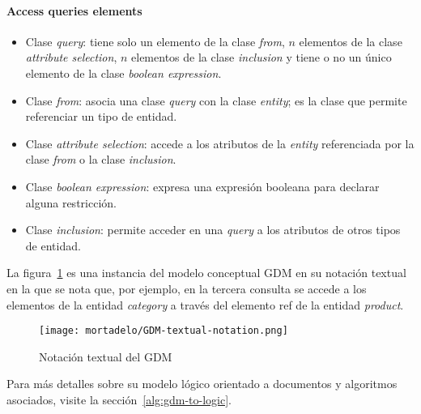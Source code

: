 \paragraph*{Access queries elements}


\begin{itemize}
    
    \item Clase \textit{query}: tiene solo un elemento de la clase \textit{from}, $n$ elementos de la clase \textit{attribute selection}, $n$ elementos de la clase \textit{inclusion} y tiene o no un único elemento de la clase \textit{boolean expression}.
    \item Clase \textit{from}: asocia una clase \textit{query} con la clase \textit{entity}; es la clase que permite referenciar un tipo de entidad.
    \item Clase \textit{attribute selection}: accede a los atributos de la \textit{entity} referenciada por la clase \textit{from} o la clase \textit{inclusion}.
    \item Clase \textit{boolean expression}: expresa una expresión booleana para declarar alguna restricción.
    \item Clase \textit{inclusion}: permite acceder en una \textit{query} a los atributos de otros tipos de entidad.
    
\end{itemize}

La figura~\ref{img:mortadelo-gdm.textual.notation} es una instancia del modelo conceptual GDM en su notación textual en la que se nota que, por ejemplo, en la tercera consulta se accede a los elementos de la entidad \textit{category} a través del elemento ref de la entidad \textit{product}.


\begin{figure}[H] 
    \centering
    \texttt{[image: mortadelo/GDM-textual-notation.png]}
    \caption{Notación textual del GDM}
    \label{img:mortadelo-gdm.textual.notation}
\end{figure}


Para más detalles sobre su modelo lógico orientado a documentos y algoritmos asociados, visite la sección~\ref{alg:gdm-to-logic}.
